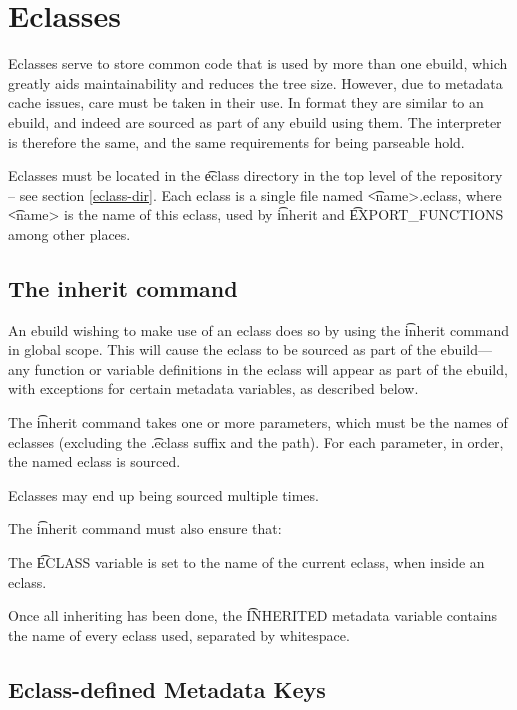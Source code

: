 \chapter{Eclasses}
\label{eclasses}

Eclasses serve to store common code that is used by more than one ebuild, which greatly aids
maintainability and reduces the tree size. However, due to metadata cache issues, care must be taken
in their use. In format they are similar to an ebuild, and indeed are sourced as part of any ebuild
using them. The interpreter is therefore the same, and the same requirements for being parseable
hold.

Eclasses must be located in the \t{eclass} directory in the top level of the repository -- see
section \ref{eclass-dir}. Each eclass is a single file named \t{<name>.eclass}, where \t{<name>} is
the name of this eclass, used by \t{inherit} and \t{EXPORT\_FUNCTIONS} among other places.

\section{The inherit command}

An ebuild wishing to make use of an eclass does so by using the \t{inherit} command in global scope.
This will cause the eclass to be sourced as part of the ebuild---any function or variable
definitions in the eclass will appear as part of the ebuild, with exceptions for certain metadata
variables, as described below.

The \t{inherit} command takes one or more parameters, which must be the names of eclasses (excluding
the \t{.eclass} suffix and the path). For each parameter, in order, the named eclass is sourced.

Eclasses may end up being sourced multiple times.

The \t{inherit} command must also ensure that:

\begin{bulletlist}
\item The \t{ECLASS} variable is set to the name of the current eclass, when inside an eclass.
\item Once all inheriting has been done, the \t{INHERITED} metadata variable contains the name of
    every eclass used, separated  by whitespace.
\end{bulletlist}

\section{Eclass-defined Metadata Keys}


